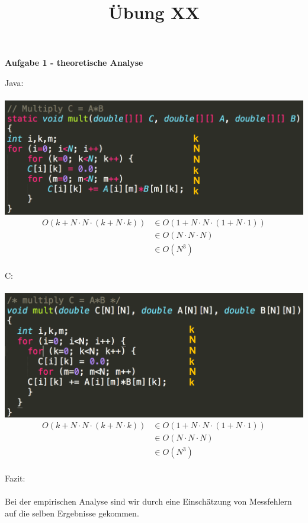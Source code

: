 \documentclass[a4paper,11pt]{scrartcl}
\title{Übung XX}
\begin{document}
\begin{center}
\LARGE{\textbf{Aufgabe 1 - theoretische Analyse}}
\end{center}
Java:\\\\
\includegraphics[width=.7\textwidth]{java.png}\\
\begin{align*}
	O(k + N\cdot N\cdot(k + N\cdot k))&\in O(1 + N\cdot N\cdot(1 + N\cdot 1))\\
	&\in O(N\cdot N\cdot N)\\
	&\in O(N^3)
\end{align*}
\\
C:\\\\
\includegraphics[width=.7\textwidth]{c.png}\\
\begin{align*}
O(k + N\cdot N\cdot(k + N\cdot k))&\in O(1 + N\cdot N\cdot(1 + N\cdot 1))\\
&\in O(N\cdot N\cdot N)\\
&\in O(N^3)
\end{align*}
\\
Fazit:\\\\
Bei der empirischen Analyse sind wir durch eine Einschätzung von Messfehlern auf die selben Ergebnisse gekommen.
\end{document}
